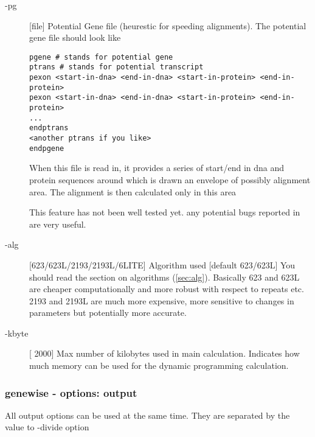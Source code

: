 \documentclass{article}
\begin{document}
\begin{description}
\item[-pg] [file] Potential Gene file (heurestic for speeding
alignments). The potential gene file should look like
\begin{verbatim}
pgene # stands for potential gene
ptrans # stands for potential transcript
pexon <start-in-dna> <end-in-dna> <start-in-protein> <end-in-protein>
pexon <start-in-dna> <end-in-dna> <start-in-protein> <end-in-protein>
...
endptrans
<another ptrans if you like>
endpgene
\end{verbatim}

When this file is read in, it provides a series of start/end in dna
and protein sequences around which is drawn an envelope of possibly
alignment area. The alignment is then calculated only in this area

This feature has not been well tested yet. any potential bugs reported in are very useful.
\item[-alg] [623/623L/2193/2193L/6LITE] Algorithm used [default 623/623L]
You should read the section on algorithms (\ref{sec:alg}). Basically
623 and 623L are cheaper computationally and more robust with respect
to repeats etc. 2193 and 2193L are much more expensive, more sensitive
to changes in parameters but potentially more accurate.
\item[-kbyte] [ 2000] Max number of kilobytes used in main
calculation. Indicates how much memory can be used for the dynamic
programming calculation.
\end{description}
\subsubsection{genewise - options: output}

All output options can be used at the same time. They are separated by
the value to -divide option
\end{document}
